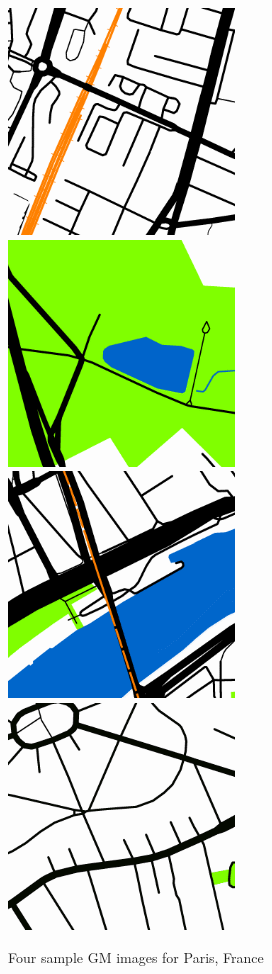 \documentclass[sageh,times]{sagej}
\begin{document}
\begin{figure}[!htbp]
    \centering    
\includegraphics[scale=1]{Images/Map1.png} 
\includegraphics[scale=1]{Images/Map2.png} 
\includegraphics[scale=1]{Images/Map3.png} 
\includegraphics[scale=1]{Images/Map4.png}  
\caption{Four sample GM images for Paris, France \citep{GoogleStatic2017}}    
 \label{fig:maps}  
\end{figure} 
\end{document}
